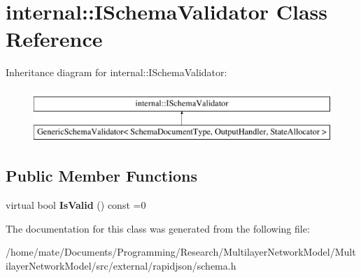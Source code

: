 \hypertarget{classinternal_1_1ISchemaValidator}{}\section{internal\+:\+:I\+Schema\+Validator Class Reference}
\label{classinternal_1_1ISchemaValidator}
Inheritance diagram for internal\+:\+:I\+Schema\+Validator\+:\begin{figure}[H]
\begin{center}
\leavevmode
\includegraphics[height=2.000000cm]{classinternal_1_1ISchemaValidator}
\end{center}
\end{figure}
\subsection*{Public Member Functions}
\begin{DoxyCompactItemize}
\item 
virtual bool {\bfseries Is\+Valid} () const  =0\hypertarget{classinternal_1_1ISchemaValidator_ad9c95f664966bec385dbe85f33a6ba3d}{}\label{classinternal_1_1ISchemaValidator_ad9c95f664966bec385dbe85f33a6ba3d}

\end{DoxyCompactItemize}


The documentation for this class was generated from the following file\+:\begin{DoxyCompactItemize}
\item 
/home/mate/\+Documents/\+Programming/\+Research/\+Multilayer\+Network\+Model/\+Multilayer\+Network\+Model/src/external/rapidjson/schema.\+h\end{DoxyCompactItemize}

